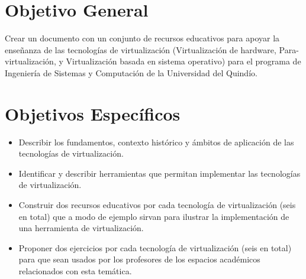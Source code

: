 \section{Objetivo General}

Crear un documento con un conjunto de recursos educativos para apoyar la enseñanza de las tecnologías de virtualización (Virtualización de hardware, Para-virtualización, y Virtualización basada en sistema operativo) para el programa de Ingeniería de Sistemas y Computación de la Universidad del Quindío.

\section{Objetivos Específicos}

\begin{itemize}
	\item Describir los fundamentos, contexto histórico y ámbitos de aplicación de las tecnologías de virtualización.\\
	
	\item Identificar y describir herramientas que permitan implementar las tecnologías de virtualización.\\
	
	\item Construir dos recursos educativos por cada tecnología de virtualización (seis en total) que a modo de ejemplo sirvan para ilustrar la implementación de una herramienta de virtualización.\\
	
	\item Proponer dos ejercicios por cada tecnología de virtualización (seis en total) para que sean usados por los profesores de los espacios académicos relacionados con esta temática. \\
\end{itemize}
